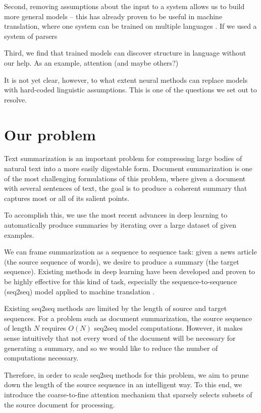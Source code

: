 \documentclass[11pt]{report}
\begin{document}
Second, removing assumptions about the input to a system allows us to build more general models -- this has already proven to be useful in machine translation, where one system can be trained on multiple languages \cite{Firat2016}. If we used a system of parsers  %

Third, we find that trained models can discover structure in language without our help. As an example, attention (and maybe others?)

It is not yet clear, however, to what extent neural methods can replace models with hard-coded linguistic assumptions. This is one of the questions we set out to resolve.


\section{Our problem}

Text summarization is an important problem for compressing large bodies of natural text into a more easily digestable form. Document summarization is one of the most challenging formulations of this problem, where given a document with several sentences of text, the goal is to produce a coherent summary that captures most or all of its salient points.

To accomplish this, we use the most recent advances in deep learning to automatically produce summaries by iterating over a large dataset of given examples.

We can frame summarization as a sequence to sequence task: given a news article (the source sequence of words), we desire to produce a summary (the target sequence). Existing methods in deep learning have been developed and proven to be highly effective for this kind of task, especially the sequence-to-sequence (seq2seq) model applied to machine translation \citep{sutskever2014sequence, bahdanau2014neural}.

Existing seq2seq methods are limited by the length of source and target sequences. For a problem such as document summarization, the source sequence of length $N$ requires $O(N)$ seq2seq model computations. However, it makes sense intuitively that not every word of the document will be necessary for generating a summary, and so we would like to reduce the number of computations necessary.

Therefore, in order to scale seq2seq methods for this problem, we aim to prune down the length of the source sequence in an intelligent way. To this end, we introduce the coarse-to-fine attention mechanism that sparsely selects subsets of the source document for processing.
\end{document}
